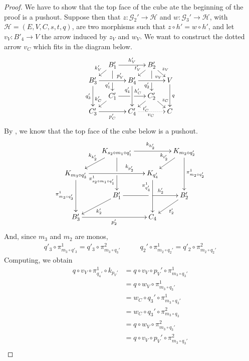 \documentclass[a4paper,UKenglish,cleveref,pdftex,thm-restate,numberwithinsect]{lipics-v2021}
\def\B{\textbf {\textup{B}}}
\begin{document}
\begin{proof}
	We have to show that the top face of the cube ate the beginning of the proof is a pushout.
	Suppose then that $z: \mathcal{G}_2' \to \mathcal{H}$ and $w: \mathcal{G}_3' \to \mathcal{H}$, with $\mathcal{H} = (E, V, C, s, t, q)$,
	are two morphisms such that $z \circ h' = w \circ h'$, and let $v_V: B'_4 \to V$ the arrow induced by $z_V$ and $w_V$.
	We want to construct the dotted arrow $v_C$ which fits in the diagram below.
	\[
	\xymatrix@C=10pt@R=6pt{
		&B_1'\ar[dd]|\hole_(.65){q_1'}\ar[rr]^{h_V'} \ar[dl]_{k_V'} && B_2' \ar[dd]|\hole_(.65){q_2'} \ar[dl]_{t_V'}\ar[dr]^{z_V}\\
		B_3'  \ar[dd]_{q_3'}\ar[rr]^(.7){p_V'} & & B_4' \ar[dd]_(.3){q_4'} \ar[rr]^(.7){v_V}&&  V\ar[dd]^{q}\\
		&C_1'\ar[rr]|\hole^(.65){h_C'} \ar[dl]_{k_C'} && C_2' \ar[dl]^{t_C'}\ar[dr]^{z_C}\\
		C'_3 \ar[rr]_{p_C'} & & C'_4\ar@{.>}[rr]_{v_C} && C
	}\]
	By , we know that the top face of the cube below is a pushout.
	\[\xymatrix@C=15pt@R=15pt{&K_{s_2\circ m_1\circ q'_1}\ar[dd]|\hole_(.65){\pi_{s_2\circ m_1\circ q'_1}^{1}}\ar[rr]^{k_{h'_2}} \ar[dl]_{k_{k'_2}} && K_{m_2\circ q'_2} \ar[dd]^{\pi_{m_2\circ q'_2}^{1}} \ar[dl]_{k_{t'_2}} \\ K_{m_3\circ q'_3}  \ar[dd]_{\pi_{m_3\circ q'_3}^{1}}\ar[rr]^(.7){k_{p'_2}} & & K_{q'_4} \ar[dd]_(.3){\pi_{q'_4}^{1}}\\&B'_1\ar[rr]|\hole^(.65){h'_2} \ar[dl]^{k'_2} && B'_2 \ar[dl]^{t'_2} \\B'_3 \ar[rr]_{p'_2} & & C_4}\]
	And, since $m_3$ and $m_2$ are monos,
	\[\begin{split}
		q'_3 \circ \pi_{m_3 \circ q'_3}^1 = q'_3 \circ \pi_{m_3\circ q_3'}^2
	\end{split}\qquad\begin{split}
		q_2' \circ \pi_{m_2 \circ q_2'}^1 = q'_2 \circ \pi_{m_2 \circ q_2'}^2
	\end{split}\]
	Computing, we obtain
	\[\begin{split}
		q \circ v_V \circ \pi_{q_4'}^1 \circ k_{p_V'} &= q \circ v_V \circ p_V' \circ \pi_{m_3 \circ q_3'}^1 \\
		&= q \circ w_V \circ \pi_{m_3 \circ q_3'}^1 \\
		&= w_C \circ q_3' \circ \pi_{m_3 \circ q_3'}^1 \\
		&= w_C \circ q_3' \circ \pi_{m_3 \circ q_3}^2 \\
		&= q \circ w_V \circ \pi_{m_3 \circ q_3'}^2 \\
		&= q \circ v_V \circ p_V' \circ \pi_{m_3 \circ q_3'}^2 \\

\end{split}\]
\end{proof}
\end{document}
